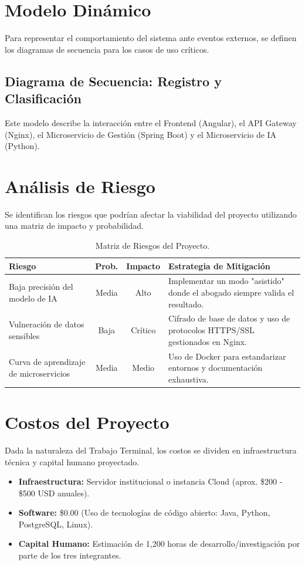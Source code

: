 \section{Modelo Dinámico}
Para representar el comportamiento del sistema ante eventos externos, se definen los diagramas de secuencia para los casos de uso críticos.

\subsection{Diagrama de Secuencia: Registro y Clasificación}
Este modelo describe la interacción entre el Frontend (Angular), el API Gateway (Nginx), el Microservicio de Gestión (Spring Boot) y el Microservicio de IA (Python).



\section{Análisis de Riesgo}
Se identifican los riesgos que podrían afectar la viabilidad del proyecto utilizando una matriz de impacto y probabilidad.

\begin{table}[htbp]
\centering
\small
\begin{tabular}{|p{3cm}|c|c|p{6cm}|}
\hline
\textbf{Riesgo} & \textbf{Prob.} & \textbf{Impacto} & \textbf{Estrategia de Mitigación} \\ \hline
Baja precisión del modelo de IA & Media & Alto & Implementar un modo "asistido" donde el abogado siempre valida el resultado. \\ \hline
Vulneración de datos sensibles & Baja & Crítico & Cifrado de base de datos y uso de protocolos HTTPS/SSL gestionados en Nginx. \\ \hline
Curva de aprendizaje de microservicios & Media & Medio & Uso de Docker para estandarizar entornos y documentación exhaustiva. \\ \hline
\end{tabular}
\caption{Matriz de Riesgos del Proyecto.}
\end{table}

\section{Costos del Proyecto}
Dada la naturaleza del Trabajo Terminal, los costos se dividen en infraestructura técnica y capital humano proyectado.

\begin{itemize}
    \item \textbf{Infraestructura:} Servidor institucional o instancia Cloud (aprox. \$200 - \$500 USD anuales).
    \item \textbf{Software:} \$0.00 (Uso de tecnologías de código abierto: Java, Python, PostgreSQL, Linux).
    \item \textbf{Capital Humano:} Estimación de 1,200 horas de desarrollo/investigación por parte de los tres integrantes.
\end{itemize}



